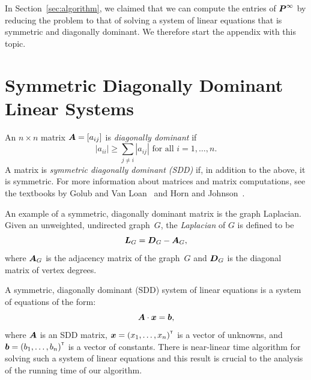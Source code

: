 In Section~\ref{sec:algorithm}, we claimed that we can compute the entries of 
$\boldsymbol{P}^{\infty}$ by reducing the problem to that of solving a system of linear 
equations that is symmetric and diagonally dominant. We therefore start the 
appendix with this topic.

\section{Symmetric Diagonally Dominant Linear Systems}

An $n \times n$ matrix $\boldsymbol{A} = [a_{ij}]$ is \emph{diagonally dominant} if 
\[
	|a_{ii}| \geq \sum_{j \neq i} {|a_{ij}|} \mbox{ for all } i = 1, \ldots, n.
\] 
A matrix is \emph{symmetric diagonally dominant (SDD)} if, in addition to the above, 
it is symmetric. For more information about matrices and matrix computations, 
see the textbooks by Golub and Van Loan~\cite{GvL13} and Horn and Johnson~\cite{HJ13}. 

An example of a symmetric, diagonally dominant matrix is the graph Laplacian. 
Given an unweighted, undirected graph~$G$, the \emph{Laplacian} of $G$ 
is defined to be 
\[
\boldsymbol{L}_G = \boldsymbol{D}_G - \boldsymbol{A}_G,
\] 
where $\boldsymbol{A}_G$ is the adjacency matrix of the graph~$G$ and $\boldsymbol{D}_G$ 
is the diagonal matrix of vertex degrees. 

A symmetric, diagonally dominant (SDD) system of linear equations is a system of 
equations of the form:
\[
	\boldsymbol{A} \cdot \boldsymbol{x} = \boldsymbol{b},
\]
where $\boldsymbol{A}$ is an SDD matrix, $\boldsymbol{x} = {(x_1, \ldots, x_n)}^{\scriptscriptstyle \mathsf{T}}$ 
is a vector of unknowns, and $\boldsymbol{b} = {(b_1, \ldots, b_n)}^{\scriptscriptstyle \mathsf{T}}$ is a vector of constants. 
There is near-linear time algorithm for solving such a system of linear equations 
and this result is crucial to the analysis of the running time of our algorithm. 


